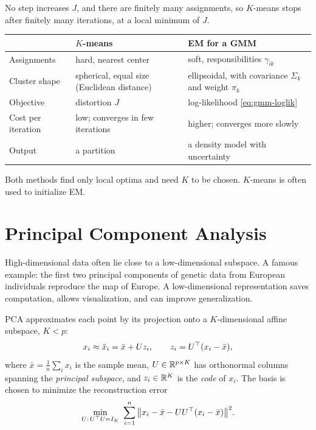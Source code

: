 No step increases $J$, and there are finitely many assignments, so $K$-means stops after finitely many iterations, at a local minimum of $J$.

\begin{center}
\small
\begin{tabularx}{\textwidth}{@{}l>{\raggedright\arraybackslash}X>{\raggedright\arraybackslash}X@{}}
\toprule
 & $K$-means & EM for a GMM \\
\midrule
Assignments & hard, nearest center & soft, responsibilities $\gamma_{ik}$ \\
Cluster shape & spherical, equal size (Euclidean distance) & ellipsoidal, with covariance $\Sigma_k$ and weight $\pi_k$ \\
Objective & distortion $J$ & log-likelihood \eqref{eq:gmm-loglik} \\
Cost per iteration & low; converges in few iterations & higher; converges more slowly \\
Output & a partition & a density model with uncertainty \\
\bottomrule
\end{tabularx}
\end{center}

Both methods find only local optima and need $K$ to be chosen. $K$-means is often used to initialize EM.

\section{Principal Component Analysis}\label{sec:pca}

High-dimensional data often lie close to a low-dimensional subspace. A famous example: the first two principal components of genetic data from European individuals reproduce the map of Europe. A low-dimensional representation saves computation, allows visualization, and can improve generalization.

PCA approximates each point by its projection onto a $K$-dimensional affine subspace, $K<p$:
\[
x_i\approx\tilde x_i=\bar x+Uz_i,\qquad z_i=U^{\top}(x_i-\bar x),
\]
where $\bar x=\frac1n\sum_ix_i$ is the sample mean, $U\in\mathbb{R}^{p\times K}$ has orthonormal columns spanning the \emph{principal subspace}, and $z_i\in\mathbb{R}^K$ is the \emph{code} of $x_i$. The basis is chosen to minimize the reconstruction error
\begin{equation}\label{eq:pca-objective}
\min_{U:\,U^{\top} U=I_K}\ \sum_{i=1}^n\big\|x_i-\bar x-UU^{\top}(x_i-\bar x)\big\|^2 .
\end{equation}

